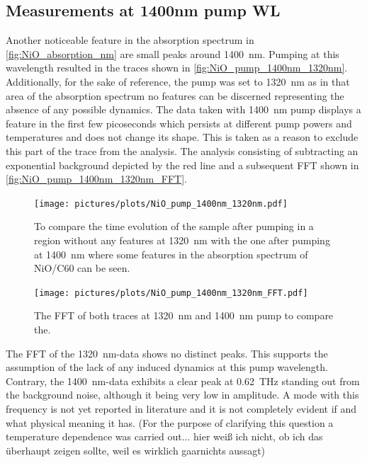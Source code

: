 \subsection{Measurements at 1400nm pump WL}
Another noticeable feature in the absorption spectrum in \autoref{fig:NiO_absorption_nm} are small peaks around \qty{1400}{nm}.
Pumping at this wavelength resulted in the traces shown in \autoref{fig:NiO_pump_1400nm_1320nm}.
Additionally, for the sake of reference, the pump was set to \qty{1320}{nm} as in that area of the absorption spectrum no features can be discerned representing the absence of any possible dynamics.
The data taken with \qty{1400}{nm} pump displays a feature in the first few picoseconds which persists at different pump powers and temperatures and does not change its shape.
This is taken as a reason to exclude this part of the trace from the analysis.
The analysis consisting of subtracting an exponential background depicted by the red line and a subsequent FFT shown in \autoref{fig:NiO_pump_1400nm_1320nm_FFT}.
\begin{figure}[ht]
    \centering
    \texttt{[image: pictures/plots/NiO\_pump\_1400nm\_1320nm.pdf]} \vspace{-0.3cm}
    \caption{To compare the time evolution of the sample after pumping in a region without any features at \qty{1320}{nm} with the one after pumping at \qty{1400}{nm} where some features in the absorption spectrum of NiO/C60 can be seen.}
    \label{fig:NiO_pump_1400nm_1320nm}
\end{figure}
\begin{figure}[ht]
    \centering
    \texttt{[image: pictures/plots/NiO\_pump\_1400nm\_1320nm\_FFT.pdf]} \vspace{-0.3cm}
    \caption{The FFT of both traces at \qty{1320}{nm} and \qty{1400}{nm} pump to compare the.}
    \label{fig:NiO_pump_1400nm_1320nm_FFT}
\end{figure}
\FloatBarrier
The FFT of the \qty{1320}{nm}-data shows no distinct peaks.
This supports the assumption of the lack of any induced dynamics at this pump wavelength.
Contrary, the \qty{1400}{nm}-data exhibits a clear peak at \qty{0.62}{THz} standing out from the background noise, although it being very low in amplitude.
A mode with this frequency is not yet reported in literature and it is not completely evident if and what physical meaning it has.
(For the purpose of clarifying this question a temperature dependence was carried out... hier weiß ich nicht, ob ich das überhaupt zeigen sollte, weil es wirklich gaarnichts aussagt)

